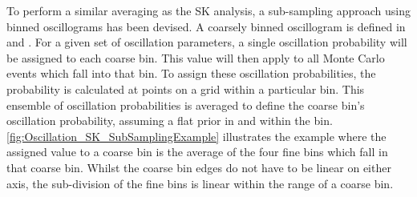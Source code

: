 
To perform a similar averaging as the SK analysis, a sub-sampling approach using binned oscillograms has been devised. A coarsely binned oscillogram is defined in  and . For a given set of oscillation parameters, a single oscillation probability will be assigned to each coarse bin. This value will then apply to all Monte Carlo events which fall into that bin. To assign these oscillation probabilities, the probability is calculated at  points on a grid within a particular bin. This ensemble of oscillation probabilities is averaged to define the coarse bin's oscillation probability, assuming a flat prior in  and  within the bin. \autoref{fig:Oscillation_SK_SubSamplingExample} illustrates the  example where the assigned value to a coarse bin is the average of the four fine bins which fall in that coarse bin. Whilst the coarse bin edges do not have to be linear on either axis, the sub-division of the fine bins is linear within the range of a coarse bin.

